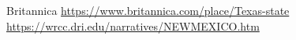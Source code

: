 \documentclass[9pt,twocolumn,twoside]{pnas-new}
\begin{document}
Britannica \url{ https://www.britannica.com/place/Texas-state}\\
\url{https://wrcc.dri.edu/narratives/NEWMEXICO.htm}

\end{document}
